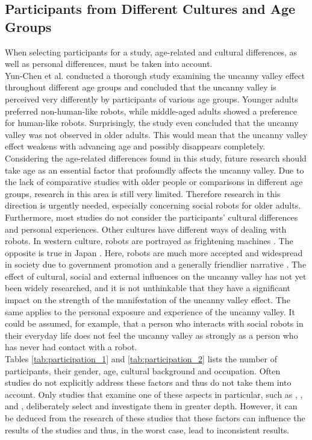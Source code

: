 \subsection{Participants from Different Cultures and Age Groups}
When selecting participants for a study, age-related and cultural differences, as well as personal differences, must be taken into account.\\
Yun-Chen et al. \cite{age_differences} conducted a thorough study examining the uncanny valley effect throughout different age groups and concluded that the uncanny valley is perceived very differently by participants of various age groups. Younger adults
preferred non-human-like robots, while middle-aged adults showed a preference for human-like robots. Surprisingly, the study even concluded that the uncanny valley was not observed in older adults. This would mean that the uncanny valley effect weakens with advancing age and possibly disappears completely. Considering the age-related differences found in this study, future research should take age as an essential factor that profoundly affects the uncanny valley. Due to the lack of comparative studies with older people or comparisons in different age groups, research in this area is still very limited. Therefore research in this direction is urgently needed, especially concerning social robots for older adults.\\
Furthermore, most studies do not consider the participants' cultural differences and personal experiences. Other cultures have different ways of dealing with robots. In western culture, robots are portrayed as frightening machines \cite{japan_robot_friendly}. The opposite is true in Japan \cite{japan_robot_friendly}. Here, robots are much more accepted and widespread in society due to government promotion and a generally friendlier narrative \cite{japan_robot_friendly}. The effect of cultural, social and external influences on the uncanny valley has not yet been widely researched, and it is not unthinkable that they have a significant impact on the strength of the manifestation of the uncanny valley effect. The same applies to the personal exposure and experience of the uncanny valley. It could be assumed, for example, that a person who interacts with social robots in their everyday life does not feel the uncanny valley as strongly as a person who has never had contact with a robot.\\
Tables \ref{tab:participation_1} and \ref{tab:participation_2} lists the number of participants, their gender, age, cultural background and occupation. Often studies do not explicitly address these factors and thus do not take them into account. Only studies that examine one of these aspects in particular, such as \cite{childrens_responding}, \cite{uncanny_infants}, \cite{uncanny_infant_discrimination} and \linebreak \cite{age_differences}, deliberately select and investigate them in greater depth. However, it can be deduced from the research of these studies that these factors can influence the results of the studies and thus, in the worst case, lead to inconsistent results. 
